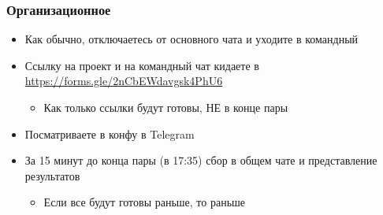 \documentclass[xetex,mathserif,serif]{beamer}
\begin{document}
    \begin{frame}
        \frametitle{Организационное}
        \begin{itemize}
            \item Как обычно, отключаетесь от основного чата и уходите в командный
            \item Ссылку на проект и на командный чат кидаете в \url{https://forms.gle/2nCbEWdavgsk4PhU6}
            \begin{itemize}
                \item Как только ссылки будут готовы, НЕ в конце пары
            \end{itemize}
            \item Посматриваете в конфу в Telegram
            \item За 15 минут до конца пары (в 17:35) сбор в общем чате и представление результатов
            \begin{itemize}
                \item Если все будут готовы раньше, то раньше
            \end{itemize}
        \end{itemize}
    \end{frame}
\end{document}
